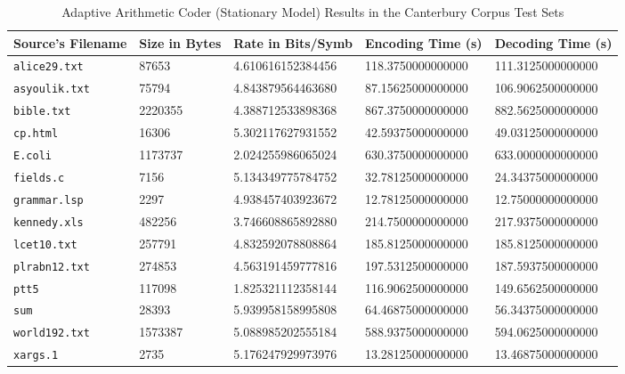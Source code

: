 \documentclass[a4paper, twocolumn]{article}
\begin{document}
    \begin{table*}[t]
        \centering
        \begin{tabular}{lllll}
        \toprule
            Source's Filename & Size in Bytes & Rate in Bits/Symb & Encoding Time (s) & Decoding Time (s) \\
        \midrule
            \texttt{alice29.txt}  &   87653 & 4.610616152384456 & 118.3750000000000 & 111.3125000000000 \\
            \texttt{asyoulik.txt} &   75794 & 4.843879564463680 & 87.15625000000000 & 106.9062500000000 \\
            \texttt{bible.txt}    & 2220355 & 4.388712533898368 & 867.3750000000000 & 882.5625000000000 \\
            \texttt{cp.html}      &   16306 & 5.302117627931552 & 42.59375000000000 & 49.03125000000000 \\
            \texttt{E.coli}       & 1173737 & 2.024255986065024 & 630.3750000000000 & 633.0000000000000 \\
            \texttt{fields.c}     &    7156 & 5.134349775784752 & 32.78125000000000 & 24.34375000000000 \\
            \texttt{grammar.lsp}  &    2297 & 4.938457403923672 & 12.78125000000000 & 12.75000000000000 \\
            \texttt{kennedy.xls}  &  482256 & 3.746608865892880 & 214.7500000000000 & 217.9375000000000 \\
            \texttt{lcet10.txt}   &  257791 & 4.832592078808864 & 185.8125000000000 & 185.8125000000000 \\
            \texttt{plrabn12.txt} &  274853 & 4.563191459777816 & 197.5312500000000 & 187.5937500000000 \\
            \texttt{ptt5}         &  117098 & 1.825321112358144 & 116.9062500000000 & 149.6562500000000 \\
            \texttt{sum}          &   28393 & 5.939958158995808 & 64.46875000000000 & 56.34375000000000 \\
            \texttt{world192.txt} & 1573387 & 5.088985202555184 & 588.9375000000000 & 594.0625000000000 \\
            \texttt{xargs.1}      &    2735 & 5.176247929973976 & 13.28125000000000 & 13.46875000000000 \\
        \bottomrule
        \end{tabular}
        \caption{Adaptive Arithmetic Coder (Stationary Model) Results in the Canterbury Corpus Test Sets}
        \label{tab:aac}
    \end{table*}
\end{document}

